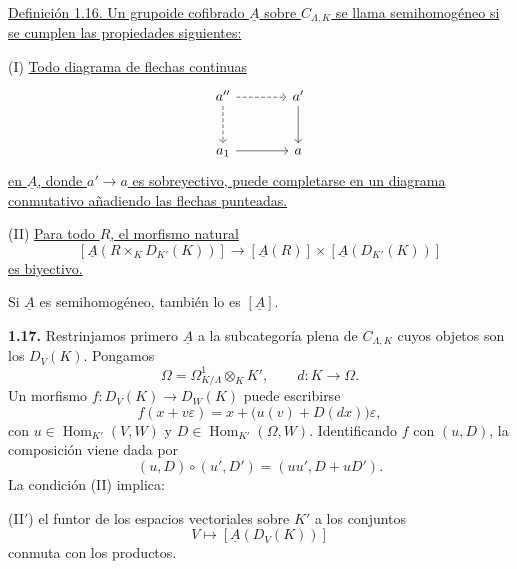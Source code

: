 \underline{Definición 1.16. Un grupoide cofibrado $\underline A$ sobre
$C_{\Lambda,K}$ se llama semihomogéneo si se cumplen las propiedades
siguientes:}

(I) \underline{Todo diagrama de flechas continuas}
\[
\begin{tikzcd}[row sep=large,column sep=large]
a'' \arrow[r,dashed] \arrow[d,dashed]
 & a' \arrow[d] \\
a_1 \arrow[r] & a
\end{tikzcd}
\]
\underline{en $\underline A$, donde $a'\longrightarrow a$ es
sobreyectivo, puede completarse en un diagrama conmutativo añadiendo
las flechas punteadas.}

(II) \underline{Para todo $R$, el morfismo natural}
\[
 [\underline A(R\times_KD_{K'}(K))]
 \longrightarrow
 [\underline A(R)]\times[\underline A(D_{K'}(K))]
\]
\underline{es biyectivo.}

Si $\underline A$ es semihomogéneo, también lo es $[\underline A]$.

\textbf{1.17.} Restrinjamos primero $\underline A$ a la subcategoría
plena de $C_{\Lambda,K}$ cuyos objetos son los $D_V(K)$. Pongamos
\[
 \Omega=\Omega^1_{K/\Lambda}\otimes_KK',
 \qquad d:K\longrightarrow\Omega.
\]
Un morfismo $f:D_V(K)\longrightarrow D_W(K)$ puede escribirse
\[
 f(x+v\varepsilon)
 =x+\bigl(u(v)+D(dx)\bigr)\varepsilon,
\]
con $u\in\operatorname{Hom}_{K'}(V,W)$ y
$D\in\operatorname{Hom}_{K'}(\Omega,W)$. Identificando $f$ con
$(u,D)$, la composición viene dada por
\[
 (u,D)\circ(u',D')=(uu',D+uD').
\]
La condición (II) implica:

(II$'$) el funtor de los espacios vectoriales sobre $K'$ a los
conjuntos
\[
 V\longmapsto[\underline A(D_V(K))]
\]
conmuta con los productos.

